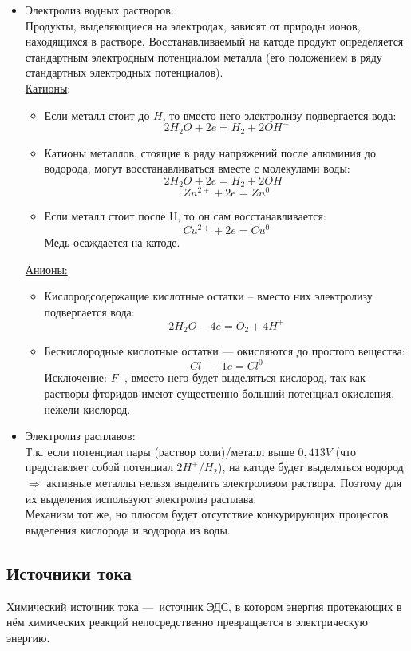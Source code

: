 \documentclass[14pt,a4paper]{scrartcl}
\begin{document}
\begin{itemize}
	\item Электролиз водных растворов: \\
	Продукты, выделяющиеся на электродах, зависят от
	природы ионов, находящихся в растворе. Восстанавливаемый на катоде продукт
	определяется стандартным электродным потенциалом металла (его положением в
	ряду стандартных электродных потенциалов). \\
	\ul{Катионы}: \\
	\begin{itemize}
		\item Если металл стоит до $H$, то вместо него электролизу подвергается вода:
		$$ 2H_2O + 2e = H_2 + 2OH^- $$
		\item Катионы металлов, стоящие в ряду напряжений после алюминия до водорода, могут восстанавливаться вместе с молекулами воды:
		$$ 2H_2O + 2e = H_2 + 2OH^- $$
		$$ Zn^{2+} + 2e = Zn^0 $$
		\item Если металл стоит после Н, то он сам восстанавливается:
		$$ Cu^{2+} + 2e = Cu^0 $$
		Медь осаждается на катоде.
	\end{itemize}
	\ul{Анионы:} \\
	\begin{itemize}
		\item Кислородсодержащие кислотные остатки -- вместо них электролизу подвергается вода:
		$$ 2H_2O - 4e = O_2 + 4H^+ $$ 
		\item Бескислородные кислотные остатки — окисляются до простого вещества:
		$$ Cl^- - 1e = Cl^0 $$
		Исключение: $F^-$, вместо него будет выделяться кислород, так как растворы фторидов имеют существенно больший потенциал окисления, нежели кислород.
	\end{itemize}
	\item Электролиз расплавов:\\
	Т.к. если потенциал пары (раствор соли)/металл выше $0,413V$ (что представляет собой потенциал $2H^+/H_2 $), на катоде будет выделяться водород $\Rightarrow$ активные металлы нельзя выделить электролизом раствора. Поэтому для их выделения используют электролиз расплава. \\
	Механизм тот же, но плюсом будет отсутствие конкурирующих процессов выделения кислорода и водорода из воды.
\end{itemize}
\subsection*{Источники тока}
Химический источник тока — источник ЭДС, в котором энергия протекающих в нём
химических реакций непосредственно превращается в электрическую энергию.
\end{document}
